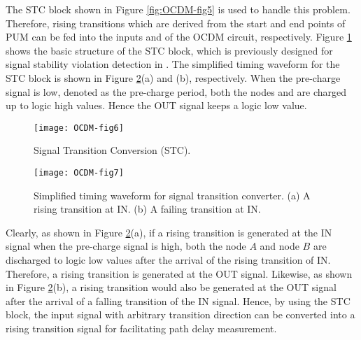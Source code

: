 The STC block shown in Figure \ref{fig:OCDM-fig5} is used to handle this problem. Therefore, rising transitions which are derived from the start and end points of PUM can be fed into the inputs and of the OCDM circuit, respectively. Figure \ref{fig:OCDM-fig6} shows the basic structure of the STC block, which is previously designed for signal stability violation detection in \cite{favalli1996sensing} \cite{agarwal2007circuit} \cite{yan2009unified}. The simplified timing waveform for the STC block is shown in Figure \ref{fig:OCDM-fig7}(a) and (b), respectively. When the pre-charge signal is low, denoted as the pre-charge period, both the nodes and are charged up to logic high values. Hence the OUT signal keeps a logic low value.

\begin{figure}[t]
\centering
\texttt{[image: OCDM-fig6]}
    \caption{Signal Transition Conversion (STC).}
    \label{fig:OCDM-fig6}
\end{figure}

\begin{figure}[t]
\centering
\texttt{[image: OCDM-fig7]}
    \caption{Simplified timing waveform for signal transition converter. (a) A rising transition at IN. (b) A failing transition at IN.}
    \label{fig:OCDM-fig7}
\end{figure}


Clearly, as shown in Figure \ref{fig:OCDM-fig7}(a), if a rising transition is generated at the IN signal when the pre-charge signal is high, both the node $A$ and node $B$ are discharged to logic low values after the arrival of the rising transition of IN. Therefore, a rising transition is generated at the OUT signal. Likewise, as shown in Figure \ref{fig:OCDM-fig7}(b), a rising transition would also be generated at the OUT signal after the arrival of a falling transition of the IN signal. Hence, by using the STC block, the input signal with arbitrary transition direction can be converted into a rising transition signal for facilitating path delay measurement.

